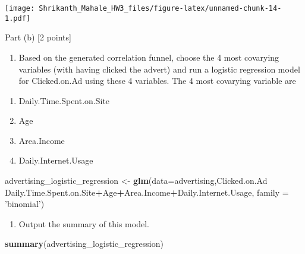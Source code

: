 \documentclass[]{article}
\newenvironment{Shaded}{\begin{snugshade}}{\end{snugshade}}
\newcommand{\KeywordTok}[1]{\textcolor[rgb]{0.13,0.29,0.53}{\textbf{#1}}}
\newcommand{\DataTypeTok}[1]{\textcolor[rgb]{0.13,0.29,0.53}{#1}}
\newcommand{\StringTok}[1]{\textcolor[rgb]{0.31,0.60,0.02}{#1}}
\newcommand{\OperatorTok}[1]{\textcolor[rgb]{0.81,0.36,0.00}{\textbf{#1}}}
\newcommand{\NormalTok}[1]{#1}
\providecommand{\tightlist}{%
  \setlength{\itemsep}{0pt}\setlength{\parskip}{0pt}}
\begin{document}
\begin{Shaded}
\end{Shaded}

\texttt{[image: Shrikanth\_Mahale\_HW3\_files/figure-latex/unnamed-chunk-14-1.pdf]}

Part (b) {[}2 points{]}

\begin{enumerate}
\def\labelenumi{\arabic{enumi}.}
\tightlist
\item
  Based on the generated correlation funnel, choose the 4 most covarying
  variables (with having clicked the advert) and run a logistic
  regression model for Clicked.on.Ad using these 4 variables. The 4 most
  covarying variable are
\end{enumerate}

\begin{enumerate}
\def\labelenumi{\arabic{enumi})}
\tightlist
\item
  Daily.Time.Spent.on.Site
\item
  Age
\item
  Area.Income
\item
  Daily.Internet.Usage
\end{enumerate}

\begin{Shaded}
\begin{Highlighting}[]
\NormalTok{advertising_logistic_regression <-}\StringTok{ }\KeywordTok{glm}\NormalTok{(}\DataTypeTok{data=}\NormalTok{advertising,Clicked.on.Ad }\OperatorTok{~}\StringTok{ }\NormalTok{Daily.Time.Spent.on.Site}\OperatorTok{+}\NormalTok{Age}\OperatorTok{+}\NormalTok{Area.Income}\OperatorTok{+}\NormalTok{Daily.Internet.Usage, }\DataTypeTok{family =} \StringTok{'binomial'}\NormalTok{)}
\end{Highlighting}
\end{Shaded}

\begin{enumerate}
\def\labelenumi{\arabic{enumi}.}
\setcounter{enumi}{1}
\tightlist
\item
  Output the summary of this model.
\end{enumerate}

\begin{Shaded}
\begin{Highlighting}[]
\KeywordTok{summary}\NormalTok{(advertising_logistic_regression)}
\end{Highlighting}
\end{Shaded}
\end{document}
